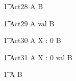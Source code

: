  
\begin{circusaction}
    	\t1 Act28 \circdef A \circendby {}  \rcirctime B \\
\end{circusaction}        

\begin{circusaction}
    	\t1 Act29 \circdef A \circendby {} \upto val \rcirctime B \\
\end{circusaction}        

\begin{circusaction}
    	\t1 Act30 \circdef A \circendby \lcirctime X : 0  \rcirctime B \\
\end{circusaction}        

\begin{circusaction}
    	\t1 Act31 \circdef A \circendby \lcirctime X : 0 \upto val \rcirctime B \\
\end{circusaction}                

\begin{circusaction}        
        \t1 \circspot A \circseq B\\
\end{circusaction}        


\begin{circus}
  \circend
\end{circus}


